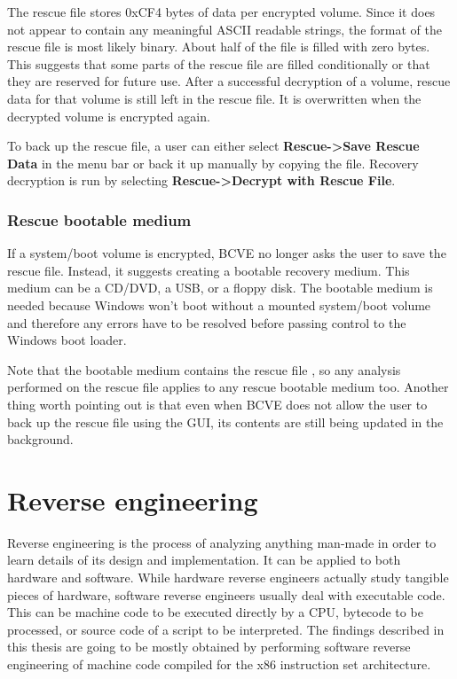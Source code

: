 \documentclass[thesis=B,english]{FITthesis}[2012/10/20]
\begin{document}
	The rescue file stores 0xCF4 bytes of data per encrypted volume. Since it does not appear to contain any meaningful ASCII readable strings, the format of the rescue file is most likely binary. About half of the file is filled with zero bytes. This suggests that some parts of the rescue file are filled conditionally or that they are reserved for future use. After a successful decryption of a volume, rescue data for that volume is still left in the rescue file. It is overwritten when the decrypted volume is encrypted again.
	
	To back up the rescue file, a user can either select \textbf{Rescue-\textgreater{}Save Rescue Data} in the menu bar or back it up manually by copying the file. Recovery decryption is run by selecting \textbf{Rescue-\textgreater{}Decrypt with Rescue File}.
	
	\subsection{Rescue bootable medium}
	
	If a system/boot volume is encrypted, BCVE no longer asks the user to save the rescue file. Instead, it suggests creating a bootable recovery medium. This medium can be a CD/DVD, a USB, or a floppy disk. The bootable medium is needed because Windows won't boot without a mounted system/boot volume and therefore any errors have to be resolved before passing control to the Windows boot loader.
	
	Note that the bootable medium contains the rescue file \cite{bcve_help}, so any analysis performed on the rescue file applies to any rescue bootable medium too. Another thing worth pointing out is that even when BCVE does not allow the user to back up the rescue file using the GUI, its contents are still being updated in the background.
	
	
	\chapter{Reverse engineering}
	\label{ch:second}	
	
	Reverse engineering is the process of analyzing anything man-made in order to learn details of its design and implementation. It can be applied to both hardware and software. While hardware reverse engineers actually study tangible pieces of hardware, software reverse engineers usually deal with executable code. This can be machine code to be executed directly by a CPU, bytecode to be processed, or source code of a script to be interpreted. The findings described in this thesis are going to be mostly obtained by performing software reverse engineering of machine code compiled for the x86 instruction set architecture.
	
\end{document}
